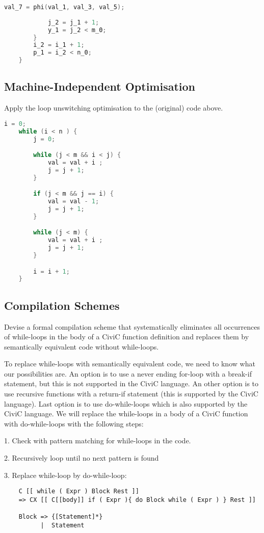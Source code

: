 \documentclass[hidelinks]{uva-inf-article}
\begin{document}
\begin{flushleft}
\begin{lstlisting}[basicstyle=\small, language=C, label=lst:code, caption=Static Single Assignment Form (SSA), captionpos=b]
            val_7 = phi(val_1, val_3, val_5);
    
            j_2 = j_1 + 1;
            y_1 = j_2 < m_0;
        }
        i_2 = i_1 + 1;
        p_1 = i_2 < n_0;
    }
\end{lstlisting}    

\subsection{Machine-Independent Optimisation}
Apply the loop unswitching optimisation to the (original) code above.

\begin{lstlisting}[basicstyle=\small, language=C, label=lst:code, caption=Loop unswitching optimisation, captionpos=b]
    i = 0;
    while (i < n ) {
        j = 0;

        while (j < m && i < j) {
            val = val + i ;
            j = j + 1;
        }

        if (j < m && j == i) { 
            val = val - 1;
            j = j + 1;
        }

        while (j < m) {
            val = val + i ;
            j = j + 1;
        }

        i = i + 1;
    }
\end{lstlisting}    

\subsection{Compilation Schemes}
Devise a formal compilation scheme that systematically eliminates all occurrences of
while-loops in the body of a CiviC function definition and replaces them by semantically 
equivalent code without while-loops.

To replace while-loops with semantically equivalent code, we need to know what our possibilities
are. An option is to use a never ending for-loop with a break-if statement, but this is not supported
in the CiviC language. An other option is to use recursive functions with a return-if statement (this
 is supported by the CiviC language). Last option is to use do-while-loops which is also supported 
by the CiviC language.
We will replace the while-loops in a body of a CiviC function with do-while-loops with the following
steps:

1. Check with pattern matching for while-loops in the code.

2. Recursively loop until no next pattern is found

3. Replace while-loop by do-while-loop:


\begin{lstlisting}
    C [[ while ( Expr ) Block Rest ]]
    => CX [[ C[[body]] if ( Expr ){ do Block while ( Expr ) } Rest ]]

    Block => {[Statement]*}
          |  Statement
\end{lstlisting}


\end{flushleft}
\end{document}
